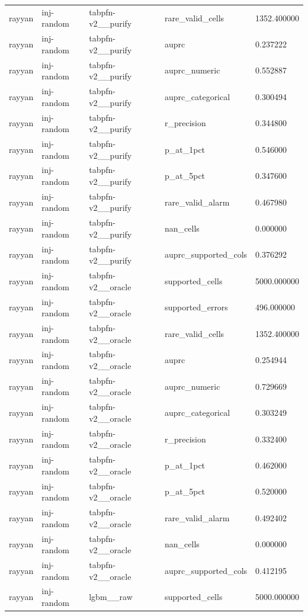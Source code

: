 \begin{tabular}{lllll}
rayyan & inj-random & tabpfn-v2\_\_purify & rare\_valid\_cells & 1352.400000 \\
rayyan & inj-random & tabpfn-v2\_\_purify & auprc & 0.237222 \\
rayyan & inj-random & tabpfn-v2\_\_purify & auprc\_numeric & 0.552887 \\
rayyan & inj-random & tabpfn-v2\_\_purify & auprc\_categorical & 0.300494 \\
rayyan & inj-random & tabpfn-v2\_\_purify & r\_precision & 0.344800 \\
rayyan & inj-random & tabpfn-v2\_\_purify & p\_at\_1pct & 0.546000 \\
rayyan & inj-random & tabpfn-v2\_\_purify & p\_at\_5pct & 0.347600 \\
rayyan & inj-random & tabpfn-v2\_\_purify & rare\_valid\_alarm & 0.467980 \\
rayyan & inj-random & tabpfn-v2\_\_purify & nan\_cells & 0.000000 \\
rayyan & inj-random & tabpfn-v2\_\_purify & auprc\_supported\_cols & 0.376292 \\
rayyan & inj-random & tabpfn-v2\_\_oracle & supported\_cells & 5000.000000 \\
rayyan & inj-random & tabpfn-v2\_\_oracle & supported\_errors & 496.000000 \\
rayyan & inj-random & tabpfn-v2\_\_oracle & rare\_valid\_cells & 1352.400000 \\
rayyan & inj-random & tabpfn-v2\_\_oracle & auprc & 0.254944 \\
rayyan & inj-random & tabpfn-v2\_\_oracle & auprc\_numeric & 0.729669 \\
rayyan & inj-random & tabpfn-v2\_\_oracle & auprc\_categorical & 0.303249 \\
rayyan & inj-random & tabpfn-v2\_\_oracle & r\_precision & 0.332400 \\
rayyan & inj-random & tabpfn-v2\_\_oracle & p\_at\_1pct & 0.462000 \\
rayyan & inj-random & tabpfn-v2\_\_oracle & p\_at\_5pct & 0.520000 \\
rayyan & inj-random & tabpfn-v2\_\_oracle & rare\_valid\_alarm & 0.492402 \\
rayyan & inj-random & tabpfn-v2\_\_oracle & nan\_cells & 0.000000 \\
rayyan & inj-random & tabpfn-v2\_\_oracle & auprc\_supported\_cols & 0.412195 \\
rayyan & inj-random & lgbm\_\_raw & supported\_cells & 5000.000000 \\

\end{tabular}
